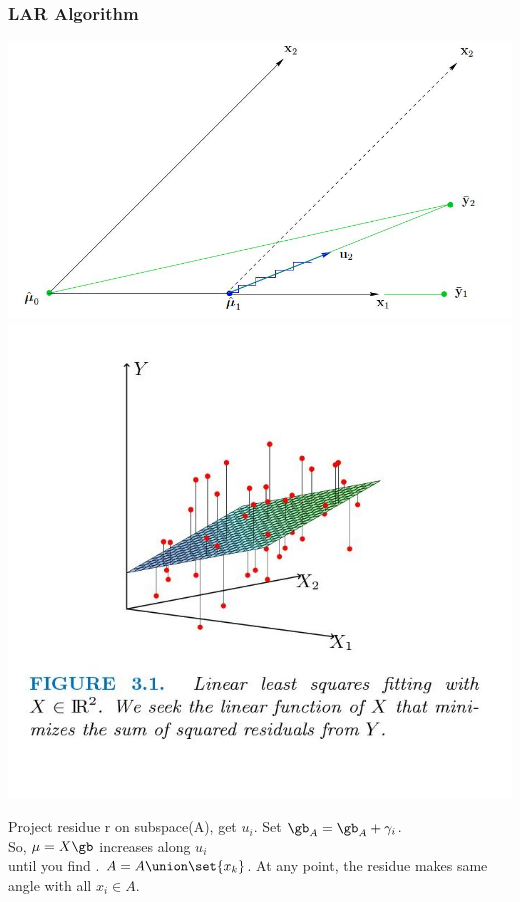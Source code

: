 \documentclass{beamer}
\begin{document}
\begin{frame}
\frametitle{LAR Algorithm}
\includegraphics[scale=.2]{images/LARSimpleExample.jpg}
\includegraphics[scale=0.1]{images/figures3-0.jpg}
\begin{itemize}
\pitem Project residue r on subspace(A), get $u_i$.
\pitem Set $\gb_{A} = \gb_{A} + \gamma_i$.\\
So, $\mu = X\gb$ increases along $u_i$\\
until you find .
\pitem $A = A \union \set{x_k}$.
\pitem {} At any point, the residue makes same angle with all $x_{i} \in A$.
\end{itemize}
\end{frame}
\end{document}
